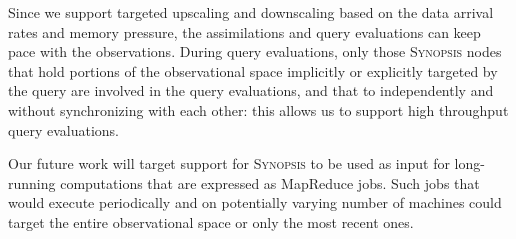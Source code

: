 \begin{description}[leftmargin=*]
\item[RQ-4:] Since we support targeted upscaling and downscaling based on the data arrival rates and memory pressure, the assimilations and query evaluations can keep pace with the observations. During query evaluations,  only those \textsc{Synopsis} nodes that hold portions of the observational space implicitly or explicitly targeted by the query are involved in the query evaluations, and that to independently and without synchronizing with each other: this allows us to support high throughput query evaluations.

Our future work will target support for \textsc{Synopsis} to be used as input for long-running computations that are expressed as MapReduce jobs. Such jobs that would execute periodically and on potentially varying number of machines could target the entire observational space or only the most recent ones.
\end{description}
